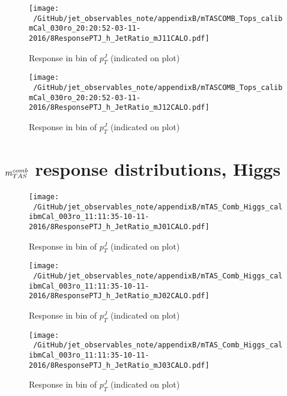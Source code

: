 \begin{figure}

\texttt{[image: ~/GitHub/jet\_observables\_note/appendixB/mTASCOMB\_Tops\_calibmCal\_030ro\_20:20:52-03-11-2016/8ResponsePTJ\_h\_JetRatio\_mJ11CALO.pdf]}
\caption{Response in bin of  $p_{T}^{J}$ (indicated on plot)} 

\end{figure}

\begin{figure}

\texttt{[image: ~/GitHub/jet\_observables\_note/appendixB/mTASCOMB\_Tops\_calibmCal\_030ro\_20:20:52-03-11-2016/8ResponsePTJ\_h\_JetRatio\_mJ12CALO.pdf]}
\caption{Response in bin of  $p_{T}^{J}$ (indicated on plot)} 

\end{figure}
\clearpage
\onecolumn
\vspace*{\fill}
\section{$m^{comb}_{TAS}$ response distributions, Higgs}
\vfill
\clearpage
\twocolumn
 \clearpage %
\begin{figure}

\texttt{[image: ~/GitHub/jet\_observables\_note/appendixB/mTAS\_Comb\_Higgs\_calibmCal\_003ro\_11:11:35-10-11-2016/8ResponsePTJ\_h\_JetRatio\_mJ01CALO.pdf]}
\caption{Response in bin of  $p_{T}^{J}$ (indicated on plot)} 

\end{figure}

\begin{figure}

\texttt{[image: ~/GitHub/jet\_observables\_note/appendixB/mTAS\_Comb\_Higgs\_calibmCal\_003ro\_11:11:35-10-11-2016/8ResponsePTJ\_h\_JetRatio\_mJ02CALO.pdf]}
\caption{Response in bin of  $p_{T}^{J}$ (indicated on plot)} 

\end{figure}

\begin{figure}

\texttt{[image: ~/GitHub/jet\_observables\_note/appendixB/mTAS\_Comb\_Higgs\_calibmCal\_003ro\_11:11:35-10-11-2016/8ResponsePTJ\_h\_JetRatio\_mJ03CALO.pdf]}
\caption{Response in bin of  $p_{T}^{J}$ (indicated on plot)} 

\end{figure}

